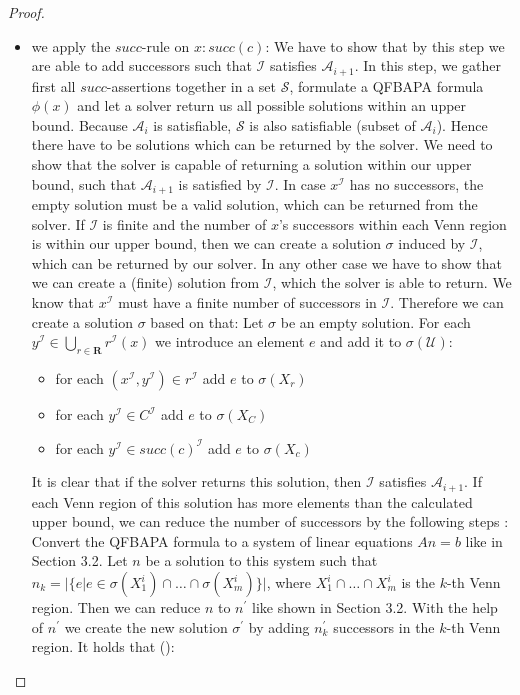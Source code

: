 \documentclass{book}
\theoremstyle{break}
\theoremstyle{definition}
\begin{document}
\begin{proof}
\begin{itemize}
\item we apply the $succ$-rule on $x:succ(c)$: We have to show that by this step we are able to add successors such that $\mathcal{I}$ satisfies $\mathcal{A}_{i+1}$. In this step, we gather first all $succ$-assertions together in a set $\mathcal{S}$, formulate a QFBAPA formula $\phi(x)$ and let a solver return us all possible solutions within an upper bound. Because $\mathcal{A}_i$ is satisfiable, $\mathcal{S}$ is also satisfiable (subset of $\mathcal{A}_i$). Hence there have to be solutions which can be returned by the solver. We need to show that the solver is capable of returning a solution within our upper bound, such that $\mathcal{A}_{i+1}$ is satisfied by $\mathcal{I}$. In case $x^\mathcal{I}$ has no successors, the empty solution must be a valid solution, which can be returned from the solver. If $\mathcal{I}$ is finite and the number of $x$'s successors within each Venn region is within our upper bound, then we can create a solution $\sigma$ induced by $\mathcal{I}$, which can be returned by our solver. In any other case we have to show that we can create a (finite) solution from $\mathcal{I}$, which the solver is able to return. We know that $x^\mathcal{I}$ must have a finite number of successors in $\mathcal{I}$. Therefore we can create a solution $\sigma$ based on that: Let $\sigma$ be an empty solution. For each $y^\mathcal{I}\in \bigcup_{r\in\mathbf{R}}r^\mathcal{I}(x)$ we introduce an element $e$ and add it to $\sigma(\mathcal{U})$:
\begin{itemize}
\item for each $(x^\mathcal{I},y^\mathcal{I})\in r^\mathcal{I}$ add $e$ to $\sigma(X_r)$
\item for each $y^\mathcal{I}\in C^\mathcal{I}$ add $e$ to $\sigma(X_C)$
\item for each $y^\mathcal{I}\in succ(c)^\mathcal{I}$ add $e$ to $\sigma(X_c)$
\end{itemize}
It is clear that if the solver returns this solution, then $\mathcal{I}$ satisfies $\mathcal{A}_{i+1}$. If each Venn region of this solution has more elements than the calculated upper bound, we can reduce the number of successors by the following steps \cite{knapsack}: Convert the QFBAPA formula to a system of linear equations $An=b$ like in Section 3.2. Let $n$ be a solution to this system such that $n_k=|\{e|e\in \sigma(X^i_1)\cap\dots\cap\sigma(X^i_m)\}|$, where $X^i_1\cap\dots\cap X^i_m$ is the $k$-th Venn region. Then we can reduce $n$ to $n^\prime$ like shown in Section 3.2. With the help of $n^\prime$ we create the new solution $\sigma^\prime$ by adding $n^\prime_k$ successors in the $k$-th Venn region. It holds that (\dag):

\end{itemize}
\end{proof}
\end{document}
